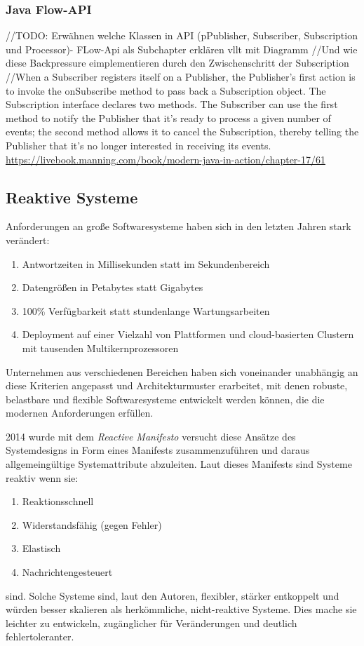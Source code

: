 \subsubsection{Java Flow-API}
\label{section:java_flow_api}
//TODO: Erwähnen welche Klassen in API (pPublisher, Subscriber, Subscription und Processor)- FLow-Api als Subchapter erklären vllt mit Diagramm
//Und wie diese Backpressure eimplementieren durch den Zwischenschritt der Subscription
//When a Subscriber registers itself on a Publisher, the Publisher’s first action is to
invoke the onSubscribe method to pass back a Subscription object. The Subscription interface
declares two methods. The Subscriber can use the first method to notify the Publisher that it’s ready to process a
given number of events; the second method allows it to cancel the Subscription, thereby telling the Publisher that
it’s no longer interested in receiving its events.
\url{https://livebook.manning.com/book/modern-java-in-action/chapter-17/61}
\subsection{Reaktive Systeme}
\label{section:reaktive_systeme}
Anforderungen an große Softwaresysteme haben sich in den letzten Jahren stark verändert:
\begin{enumerate}
	\item Antwortzeiten in Millisekunden statt im Sekundenbereich
	\item Datengrößen in Petabytes statt Gigabytes
	\item 100\% Verfügbarkeit statt stundenlange Wartungsarbeiten
	\item Deployment auf einer Vielzahl von Plattformen und cloud-basierten Clustern mit tausenden Multikernprozessoren
\end{enumerate}

Unternehmen aus verschiedenen Bereichen haben sich voneinander unabhängig an diese Kriterien angepasst und Architekturmuster
erarbeitet, mit denen robuste, belastbare und flexible Softwaresysteme entwickelt werden können, die die modernen Anforderungen
erfüllen.

2014 wurde mit dem \textit{Reactive Manifesto} versucht diese Ansätze des Systemdesigns in Form eines Manifests zusammenzuführen
und daraus allgemeingültige Systemattribute abzuleiten.
Laut dieses Manifests sind Systeme reaktiv wenn sie:
\begin{enumerate}
	\item Reaktionsschnell
	\item Widerstandsfähig (gegen Fehler)
	\item Elastisch
	\item Nachrichtengesteuert
\end{enumerate}
sind.
Solche Systeme sind, laut den Autoren, flexibler, stärker entkoppelt und würden besser skalieren als herkömmliche, nicht-reaktive Systeme.
Dies mache sie leichter zu entwickeln, zugänglicher für Veränderungen und deutlich fehlertoleranter.

